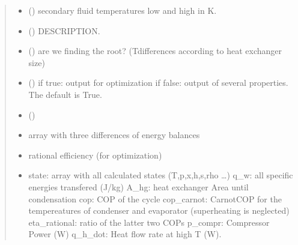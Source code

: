 \documentclass[letterpaper,10pt,english]{sphinxmanual}
\begin{document}
\begin{fulllineitems}
\begin{quote}
\begin{description}
\begin{itemize}
\item {} 
\sphinxAtStartPar
{} (\sphinxstyleliteralemphasis{\sphinxupquote{, }}) \textendash{} secondary fluid temperatures low and high in K.

\item {} 
\sphinxAtStartPar
{} () \textendash{} DESCRIPTION.

\item {} 
\sphinxAtStartPar
{} (\sphinxstyleliteralemphasis{\sphinxupquote{, }}) \textendash{} are we finding the root? (T\sphinxhyphen{}differences according to heat exchanger size)

\item {} 
\sphinxAtStartPar
{} (\sphinxstyleliteralemphasis{\sphinxupquote{, }}) \textendash{} if true: output for optimization
if false: output of several properties. The default is True.

\item {} 
\sphinxAtStartPar
{} () \textendash{} 

\end{itemize}

\sphinxAtStartPar
\begin{itemize}
\item {} 
\sphinxAtStartPar
{} \textendash{} array with three differences of energy balances

\item {} 
\sphinxAtStartPar
{} \textendash{} rational efficiency (for optimization)

\item {} 
\sphinxAtStartPar
{} \textendash{} state: array with all calculated states (T,p,x,h,s,rho …)
q\_w: all specific energies transfered (J/kg)
A\_hg: heat exchanger Area until condensation
cop: COP of the cycle
cop\_carnot: Carnot\sphinxhyphen{}COP for the tempereatures of condenser and
evaporator (superheating is neglected)
eta\_rational: ratio of the latter two COPs
p\_compr: Compressor Power (W)
q\_h\_dot: Heat flow rate at high T (W).

\end{itemize}


\end{description}\end{quote}

\end{fulllineitems}
\end{document}
